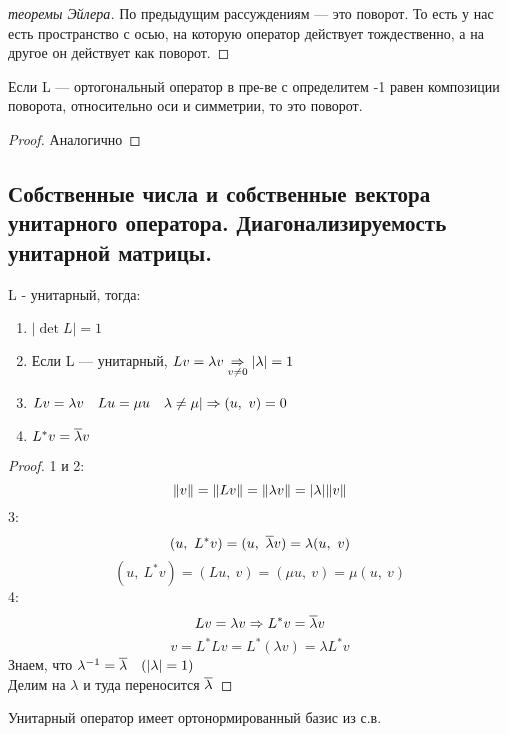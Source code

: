 \documentclass[main]{subfiles}
\begin{document}
\begin{proof}[теоремы Эйлера]
        По предыдущим рассуждениям --- это поворот. То есть у нас есть пространство с осью, на которую оператор действует тождественно, а на другое он действует как поворот.
    \end{proof}

    \begin{utv}
        Если L --- ортогональный оператор в пре-ве с определитем -1 равен композиции поворота, относительно оси и симметрии, то это поворот.
    \end{utv}

    \begin{proof}
        Аналогично
    \end{proof}

    \newpage
    \subsection{Собственные числа и собственные вектора унитарного оператора. Диагонализируемость унитарной матрицы.}

    \begin{utv}
        L - унитарный, тогда:
		\begin{enumerate}
			\item $|\det L| = 1$
			\item Если L --- унитарный, $Lv = \lambda v \underset{v \neq 0}{\Rightarrow} |\lambda| = 1$
			\item $Lv = \lambda v \quad Lu = \mu u \quad \lambda \neq \mu | \Rightarrow (u,\ v) = 0$
            \item $L^* v = \overline{\lambda} v$
		\end{enumerate}
	\end{utv}

	\begin{proof}
		1 и 2:
		\[\lVert v \rVert = \lVert Lv \rVert = \lVert \lambda v \rVert = |\lambda| \lVert v \rVert\]
		3:
		\[(u,\ L^* v) = (u,\ \ol{\lambda} v) = \lambda (u,\ v)\]
		\[(u,\ L^* v) = (Lu,\ v) = (\mu u,\ v) = \mu(u,\ v)\]
		4:
        \[Lv = \lambda v \Rightarrow L^* v = \overline{\lambda} v\]
		\[v = L^* L v = L^* (\lambda v) = \lambda L^* v\]
        Знаем, что $\lambda^{-1} = \overline{\lambda} \quad (|\lambda| = 1)$\\
		Делим на $\lambda$ и туда переносится $\overline{\lambda}$
	\end{proof}

    \begin{theorem}
        Унитарный оператор имеет ортонормированный базис из с.в.
    \end{theorem}
\end{document}
